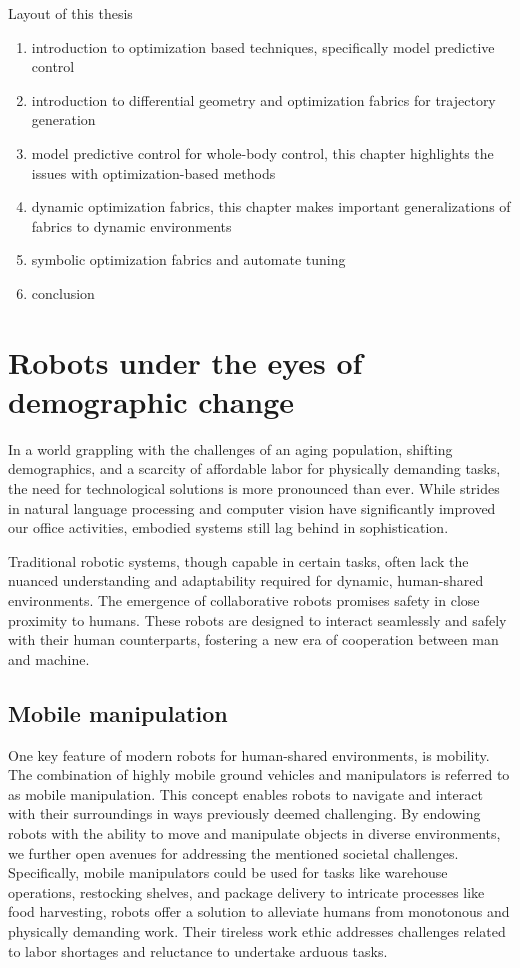 Layout of this thesis
\begin{enumerate}
  \item introduction to optimization based techniques, specifically model
  predictive control
  \item introduction to differential geometry and optimization fabrics for
  trajectory generation
  \item model predictive control for whole-body control, this chapter highlights
  the issues with optimization-based methods
  \item dynamic optimization fabrics, this chapter makes important
  generalizations of fabrics to dynamic environments  
  \item symbolic optimization fabrics and automate tuning
  \item conclusion
\end{enumerate}
\fi

\section{Robots under the eyes of demographic change}

In a world grappling with the challenges of an aging population, shifting
demographics, and a scarcity of affordable labor for physically demanding tasks,
the need for technological solutions is more pronounced than ever. While
strides in natural language processing and computer vision have significantly
improved our office activities, embodied systems still
lag behind in sophistication.

Traditional robotic systems, though capable in certain tasks, often lack the
nuanced understanding and adaptability required for dynamic, human-shared
environments. The emergence of collaborative robots promises
safety in close proximity to humans. These robots are designed to interact
seamlessly and safely with their human counterparts, fostering a new era of
cooperation between man and machine. 

\subsection{Mobile manipulation}

One key feature of modern robots for human-shared environments, is mobility. The
combination of highly mobile ground vehicles and manipulators is referred to as
mobile manipulation. This concept enables robots to navigate and interact with
their surroundings in ways previously deemed challenging. By endowing robots
with the ability to move and manipulate objects in diverse environments, we
further open avenues for addressing the mentioned societal challenges.
Specifically, mobile manipulators could be used for tasks like warehouse
operations, restocking shelves, and package delivery to intricate processes like
food harvesting, robots offer a solution to alleviate humans from monotonous and
physically demanding work. Their tireless work ethic addresses challenges
related to labor shortages and reluctance to undertake arduous tasks.

